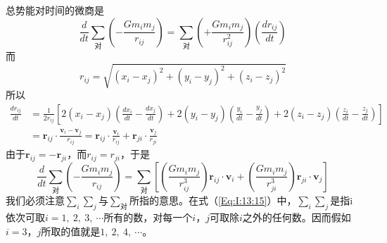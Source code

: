 总势能对时间的微商是
\begin{equation*}
    \frac{d}{dt} \sum_{\text{对}} (-\frac{Gm_im_j}{r_{ij}}) = \sum_{\text{对}} (+\frac{Gm_im_j}{r_{ij}^2}) (\frac{dr_{ij}}{dt}) 
\end{equation*}
而
\begin{equation*}
    r_{ij} = \sqrt{(x_i - x_j)^2 + (y_i - y_j)^2 + (z_i - z_j)^2}
\end{equation*}
所以
\begin{equation*}
    \begin{aligned}
        \frac{dr_{ij}}{dt}&=\frac{1}{2r_{ij}}[2(x_i - x_j)(\frac{dx_i}{dt} - \frac{dx_j}{dt}) + 2(y_i - y_j)(\frac{y_i}{dt} - \frac{y_j}{dt}) + 2(z_i - z_j)(\frac{z_i}{dt} - \frac{z_j}{dt})] \\
        &=\boldsymbol{r}_{ij} \cdot \frac{\boldsymbol{v}_i - \boldsymbol{v}_j}{r_{ij}}=\boldsymbol{r}_{ij} \cdot \frac{\boldsymbol{v}_i}{r_{ij}} + \boldsymbol{r}_{ji} \cdot \frac{\boldsymbol{v}_j}{r_{ji}}
    \end{aligned}
\end{equation*}
由于$\boldsymbol{r}_{ij} = -\boldsymbol{r}_{ji}$，而$r_{ij}=r_{ji}$，于是
\begin{equation}
    \label{Eq:I:13:16}
    \frac{d}{dt} \sum_{\text{对}} (-\frac{Gm_im_j}{r_{ij}}) = \sum_{\text{对}} [(\frac{Gm_im_j}{r_{ij}^3})\boldsymbol{r}_{ij} \cdot \boldsymbol{v}_{i} + (\frac{Gm_im_j}{r_{ji}^3})\boldsymbol{r}_{ji} \cdot \boldsymbol{v}_{j}]
\end{equation}
我们必须注意$\sum_i{\sum_j}$与$\sum_{\text{对}}$所指的意思。在式（\ref{Eq:I:13:15}）中，$\sum_i{\sum_j}$是指i依次可取$i=1,~2,~3,~ \cdots$所有的数，对每一个$i$，$j$可取除$i$之外的任何数。因而假如$i=3$，$j$所取的值就是$1,~2,~4,~ \cdots$。

